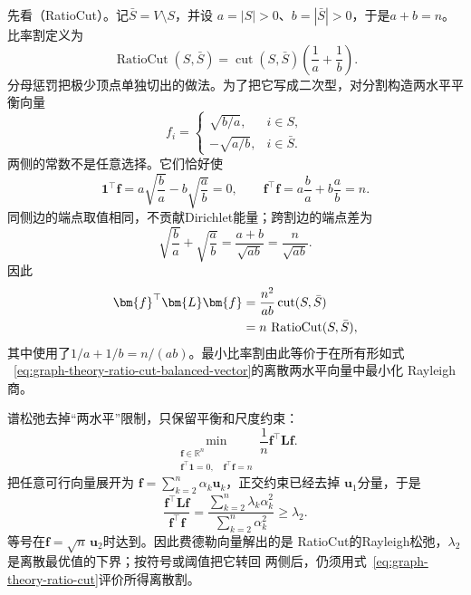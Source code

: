 先看（RatioCut）。记\(\bar S=V\setminus S\)，并设
\(a=|S|>0\)、\(b=|\bar S|>0\)，于是\(a+b=n\)。比率割定义为
\begin{equation}
  \operatorname{RatioCut}(S,\bar S)
  =
  \operatorname{cut}(S,\bar S)
  \left(\frac1a+\frac1b\right).
  \label{eq:graph-theory-ratio-cut}
\end{equation}
分母惩罚把极少顶点单独切出的做法。为了把它写成二次型，对分割构造两水平平衡向量
\begin{equation}
  f_i=
  \begin{cases}
    \sqrt{b/a},&i\in S,\\
    -\sqrt{a/b},&i\in\bar S.
  \end{cases}
  \label{eq:graph-theory-ratio-cut-balanced-vector}
\end{equation}
两侧的常数不是任意选择。它们恰好使
\[
  \bm{1}^{\top}\bm{f}
  =a\sqrt{\frac ba}-b\sqrt{\frac ab}=0,
  \qquad
  \bm{f}^{\top}\bm{f}
  =a\frac ba+b\frac ab=n.
\]
同侧边的端点取值相同，不贡献Dirichlet能量；跨割边的端点差为
\[
  \sqrt{\frac ba}+\sqrt{\frac ab}
  =\frac{a+b}{\sqrt{ab}}=\frac{n}{\sqrt{ab}}.
\]
因此
\begin{align}
  \bm{f}^{\top}\bm{L}\bm{f}
  &=
  \frac{n^2}{ab}\operatorname{cut}(S,\bar S)\notag\\
  &=
  n\,\operatorname{RatioCut}(S,\bar S),
  \label{eq:graph-theory-ratio-cut-energy}
\end{align}
其中使用了\(1/a+1/b=n/(ab)\)。最小比率割由此等价于在所有形如式
~\eqref{eq:graph-theory-ratio-cut-balanced-vector}的离散两水平向量中最小化
Rayleigh商。

谱松弛去掉“两水平”限制，只保留平衡和尺度约束：
\begin{equation}
  \min_{\substack{\bm{f}\in\mathbb{R}^n\\
                  \bm{f}^{\top}\bm{1}=0,\quad
                  \bm{f}^{\top}\bm{f}=n}}
  \frac1n\bm{f}^{\top}\bm{L}\bm{f}.
  \label{eq:graph-theory-ratio-cut-relaxation}
\end{equation}
把任意可行向量展开为
\(\bm{f}=\sum_{k=2}^{n}\alpha_k\bm{u}_k\)，正交约束已经去掉
\(\bm{u}_1\)分量，于是
\[
  \frac{\bm{f}^{\top}\bm{L}\bm{f}}
       {\bm{f}^{\top}\bm{f}}
  =
  \frac{\sum_{k=2}^{n}\lambda_k\alpha_k^2}
       {\sum_{k=2}^{n}\alpha_k^2}
  \geq\lambda_2.
\]
等号在\(\bm{f}=\sqrt n\,\bm{u}_2\)时达到。因此费德勒向量解出的是
RatioCut的Rayleigh松弛，\(\lambda_2\)是离散最优值的下界；按符号或阈值把它转回
两侧后，仍须用式~\eqref{eq:graph-theory-ratio-cut}评价所得离散割。

